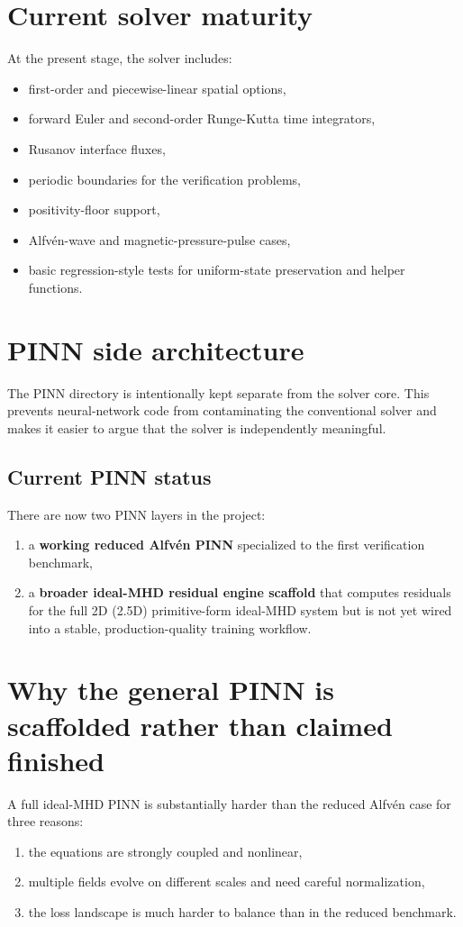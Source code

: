 \documentclass[11pt]{article}
\begin{document}
\section{Current solver maturity}
At the present stage, the solver includes:
\begin{itemize}[leftmargin=1.8em]
    \item first-order and piecewise-linear spatial options,
    \item forward Euler and second-order Runge-Kutta time integrators,
    \item Rusanov interface fluxes,
    \item periodic boundaries for the verification problems,
    \item positivity-floor support,
    \item Alfv\'en-wave and magnetic-pressure-pulse cases,
    \item basic regression-style tests for uniform-state preservation and helper functions.
\end{itemize}

\section{PINN side architecture}
The PINN directory is intentionally kept separate from the solver core. This prevents neural-network code from contaminating the conventional solver and makes it easier to argue that the solver is independently meaningful.

\subsection{Current PINN status}
There are now two PINN layers in the project:
\begin{enumerate}[leftmargin=1.8em]
    \item a \textbf{working reduced Alfv\'en PINN} specialized to the first verification benchmark,
    \item a \textbf{broader ideal-MHD residual engine scaffold} that computes residuals for the full 2D (2.5D) primitive-form ideal-MHD system but is not yet wired into a stable, production-quality training workflow.
\end{enumerate}

\section{Why the general PINN is scaffolded rather than claimed finished}
A full ideal-MHD PINN is substantially harder than the reduced Alfv\'en case for three reasons:
\begin{enumerate}[leftmargin=1.8em]
    \item the equations are strongly coupled and nonlinear,
    \item multiple fields evolve on different scales and need careful normalization,
    \item the loss landscape is much harder to balance than in the reduced benchmark.
\end{enumerate}
\end{document}
